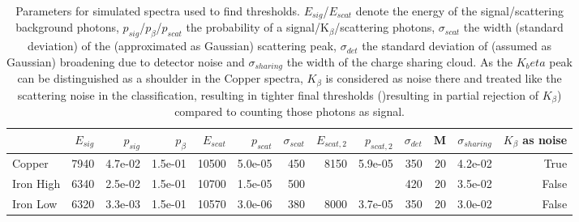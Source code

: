 \begin{table}[h]
	\centering
	\caption[Parameters for simulated spectra used to find thresholds]{Parameters for simulated spectra used to find thresholds. $E_{sig}$/$E_{scat}$ denote the energy of the signal/scattering background photons, $p_{sig}$/$p_{\beta}$/$p_{scat}$ the probability of a signal/K$_{\beta}$/scattering photons, $\sigma_{scat}$ the width (standard deviation) of the (approximated as Gaussian) scattering peak, $\sigma_{det}$ the standard deviation of (assumed as Gaussian) broadening due to detector noise and $\sigma_{sharing}$ the width of the charge sharing cloud.  As the $K_beta$ peak can be distinguished as a shoulder in the Copper spectra, $K_{\beta}$ is considered as noise there and treated like the scattering noise in the classification, resulting in tighter final thresholds ()resulting in partial rejection of  $K_{\beta}$) compared to counting those photons as signal.}
	\label{tab:fitvalues}
		\tiny
	\begin{adjustwidth}{-2em}{-2em}	
\begin{tabular}{lrrrrrrrrrrrr}

	\toprule
	{} &  $E_{sig}$ &  $p_{sig}$ &  $p_{\beta}$ &  $E_{scat}$ &  $p_{scat}$ &  $\sigma_{scat}$ & $E_{scat,2}$ & $p_{scat,2}$ &  $\sigma_{det}$ &   M &  $\sigma_{sharing}$ &  $K_{\beta}$ as noise \\	\midrule
	Copper &          7940 &       4.7e-02 &     1.5e-01 &          10500 &        5.0e-05 &                 450 &           8150 &        5.9e-05 &             350 &  20 &             4.2e-02 &                  True \\
	Iron High         &          6340 &       2.5e-02 &     1.5e-01 &          10700 &        1.5e-05 &                 500 &                &                &             420 &  20 &             3.5e-02 &                 False \\
	Iron Low          &          6320 &       3.3e-03 &     1.5e-01 &          10570 &        3.0e-06 &                 380 &           8000 &        3.7e-05 &             350 &  20 &             3.0e-02 &                 False \\
	\bottomrule
\end{tabular}
\end{adjustwidth}
\end{table}


